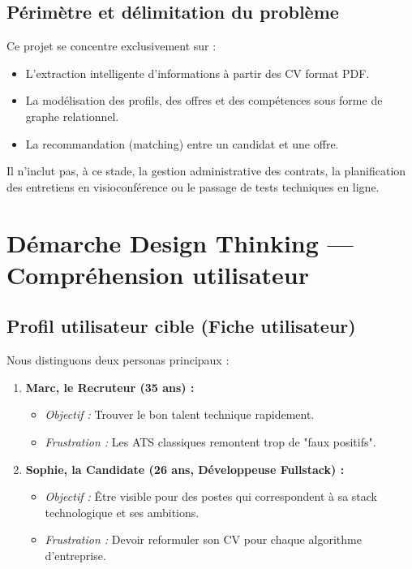 \documentclass[12pt,a4paper]{report}
\begin{document}
\subsection{Périmètre et délimitation du problème}
Ce projet se concentre exclusivement sur :
\begin{itemize}
    \item L'extraction intelligente d'informations à partir des CV format PDF.
    \item La modélisation des profils, des offres et des compétences sous forme de graphe relationnel.
    \item La recommandation (matching) entre un candidat et une offre.
\end{itemize}
Il n'inclut pas, à ce stade, la gestion administrative des contrats, la planification des entretiens en visioconférence ou le passage de tests techniques en ligne.

\section{Démarche Design Thinking — Compréhension utilisateur}

\subsection{Profil utilisateur cible (Fiche utilisateur)}
Nous distinguons deux personas principaux :
\begin{enumerate}
    \item \textbf{Marc, le Recruteur (35 ans) :} 
    \begin{itemize}
        \item \textit{Objectif :} Trouver le bon talent technique rapidement.
        \item \textit{Frustration :} Les ATS classiques remontent trop de "faux positifs".
    \end{itemize}
    \item \textbf{Sophie, la Candidate (26 ans, Développeuse Fullstack) :}
    \begin{itemize}
        \item \textit{Objectif :} Être visible pour des postes qui correspondent à sa stack technologique et ses ambitions.
        \item \textit{Frustration :} Devoir reformuler son CV pour chaque algorithme d'entreprise.
    \end{itemize}
\end{enumerate}
\end{document}
